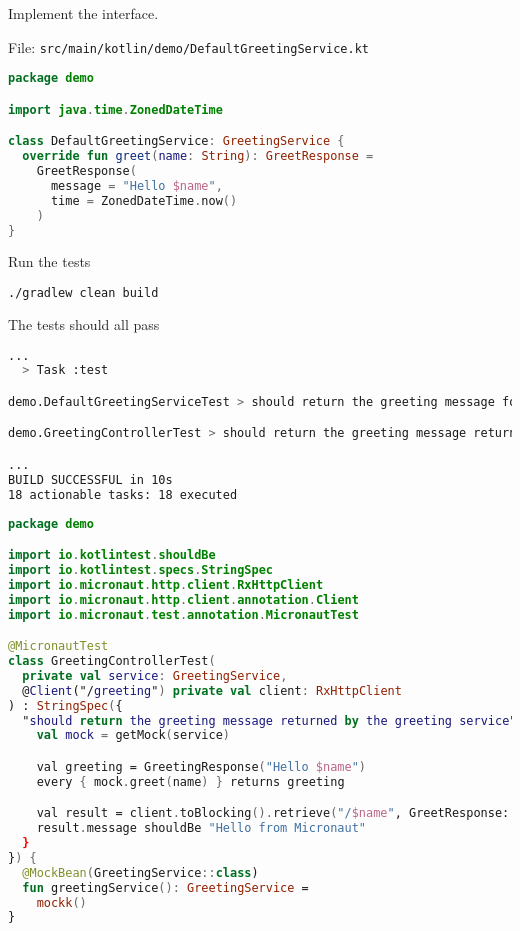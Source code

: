 \begin{enumerate}
Implement the interface.


File: \texttt{src/main/kotlin/demo/DefaultGreetingService.kt}
\begin{lstlisting}[language=Kotlin]
package demo

import java.time.ZonedDateTime

class DefaultGreetingService: GreetingService {
  override fun greet(name: String): GreetResponse =
    GreetResponse(
      message = "Hello $name",
      time = ZonedDateTime.now()
    )
}
\end{lstlisting}

Run the tests

\begin{lstlisting}[language=bash]
./gradlew clean build
\end{lstlisting}

The tests should all pass

\begin{lstlisting}[language=bash]
...
  > Task :test

demo.DefaultGreetingServiceTest > should return the greeting message for the given name PASSED

demo.GreetingControllerTest > should return the greeting message returned by the greeting service PASSED

...
BUILD SUCCESSFUL in 10s
18 actionable tasks: 18 executed
\end{lstlisting}



\begin{lstlisting}[language=Kotlin]
package demo

import io.kotlintest.shouldBe
import io.kotlintest.specs.StringSpec
import io.micronaut.http.client.RxHttpClient
import io.micronaut.http.client.annotation.Client
import io.micronaut.test.annotation.MicronautTest

@MicronautTest
class GreetingControllerTest(
  private val service: GreetingService,
  @Client("/greeting") private val client: RxHttpClient
) : StringSpec({
  "should return the greeting message returned by the greeting service" {
    val mock = getMock(service)

    val greeting = GreetingResponse("Hello $name")
    every { mock.greet(name) } returns greeting

    val result = client.toBlocking().retrieve("/$name", GreetResponse::class.java)
    result.message shouldBe "Hello from Micronaut"
  }
}) {
  @MockBean(GreetingService::class)
  fun greetingService(): GreetingService =
    mockk()
}
\end{lstlisting}

\end{enumerate}


